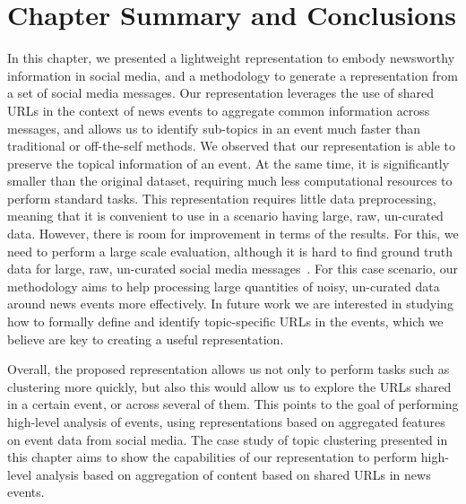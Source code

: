 \section{Chapter Summary and Conclusions}\label{sec:conclusions}





In this chapter, we presented a lightweight representation to embody newsworthy
information in social media, and a methodology to generate a representation from
a set of social media messages. 
%
Our representation leverages the use of shared URLs in the context of news
events to aggregate common information across messages, and allows us to
identify sub-topics in an event much faster than traditional or off-the-self
methods.
%
We observed that our representation is able to preserve the topical information
of an event.
%
At the same time, it is significantly smaller than the original
dataset, requiring much less computational resources to perform standard tasks.
%
This representation requires little data preprocessing, meaning that it is
convenient to use in a scenario having large, raw, un-curated data.
%
However, there is room for improvement in terms of the results.
%
For this, we need to perform a large scale evaluation, although it is hard to
find ground truth data for large, raw, un-curated social media
messages~\cite{Alonso:2015:WCW:2740908.2745397}.
%
For this case scenario, our methodology aims to help processing large quantities
of noisy, un-curated data around news events more effectively.
%
In future work we are interested in studying how to formally define and identify
topic-specific URLs in the events, which we believe are key to creating a useful
representation.
%

Overall, the proposed representation allows us not only to perform tasks such as
clustering more quickly, but also this would allow us to explore the URLs shared
in a certain event, or across several of them.
%
This points to the goal of performing high-level analysis of events, using
representations based on aggregated features on event data from social media.
%
The case study of topic clustering presented in this chapter aims to show the
capabilities of our representation to perform high-level analysis based on
aggregation of content based on shared URLs in news events.